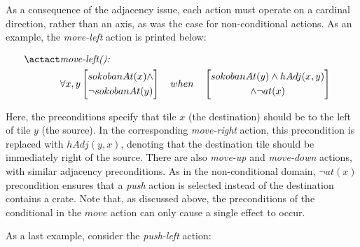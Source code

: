 \documentclass[../Master.tex]{subfiles}
\begin{document}
As a consequence of the adjacency issue, each action must operate on a cardinal direction, rather than an axis, as was the case for non-conditional actions. As an example, the \textit{move-left} action is printed below:

\begin{align*}
\actact & \textit{move-left(): } &  \\
& \forall x, y
    \left[
        \begin{gathered}
            sokobanAt(x) \land 
            \\ \neg sokobanAt(y) 
        \end{gathered}
    \right]
    \quad when \quad
    \left[ 
        \begin{gathered}
            sokobanAt(y) \land hAdj(x,y) \\ 
            \land \neg at(x)
        \end{gathered}
    \right]
\end{align*}

Here, the preconditions specify that tile $x$ (the destination) should be to the left of tile $y$ (the source). In the corresponding \textit{move-right} action, this precondition is replaced with $hAdj(y,x)$, denoting that the destination tile should be immediately right of the source. There are also \textit{move-up} and \textit{move-down} actions, with similar adjacency preconditions. As in the non-conditional domain, $\neg at(x)$ precondition ensures that a \textit{push} action is selected instead of the destination contains a crate. Note that, as discussed above, the preconditions of the conditional in the $move$ action can only cause a single effect to occur.

As a last example, consider the \textit{push-left} action:
\end{document}
